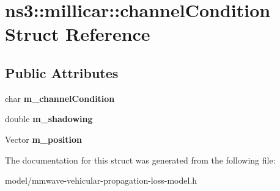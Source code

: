 \hypertarget{structns3_1_1millicar_1_1channelCondition}{}\section{ns3\+:\+:millicar\+:\+:channel\+Condition Struct Reference}
\label{structns3_1_1millicar_1_1channelCondition}
\subsection*{Public Attributes}
\begin{DoxyCompactItemize}
\item 
\mbox{\label{structns3_1_1millicar_1_1channelCondition_a461e8f09cecce8627a6bf792ec5c2c9c}} 
char {\bfseries m\+\_\+channel\+Condition}
\item 
\mbox{\label{structns3_1_1millicar_1_1channelCondition_adfd41235bbc0512bbd9b852de2678647}} 
double {\bfseries m\+\_\+shadowing}
\item 
\mbox{\label{structns3_1_1millicar_1_1channelCondition_adeb98a8ded1511c79c3857f7a02290c2}} 
Vector {\bfseries m\+\_\+position}
\end{DoxyCompactItemize}


The documentation for this struct was generated from the following file\+:\begin{DoxyCompactItemize}
\item 
model/mmwave-\/vehicular-\/propagation-\/loss-\/model.\+h\end{DoxyCompactItemize}

